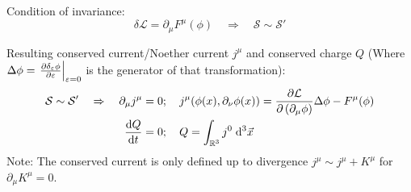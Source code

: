 		\noindent
		Condition of invariance:
		\begin{equation}
			\delta\mathcal{L} = \partial_\mu F^\mu(\phi) 
			\quad \Rightarrow \quad \mathcal{S} \sim \mathcal{S}'
		\end{equation}

		\noindent
		Resulting conserved current/Noether current $j^{\mu}$ and conserved charge $Q$ (Where $\Delta \phi = \eval{\pdv{\delta_\varepsilon \phi}{\varepsilon}}_{\varepsilon=0}$ is the generator of that transformation):
		\begin{equation}
			\begin{aligned}
				\mathcal{S} \sim \mathcal{S}' \quad\Rightarrow\quad 
				\partial_\mu j^\mu &= 0;\quad
				j^\mu \qty( \phi(x), \partial_\nu\phi(x) ) = \pdv{\mathcal{L}}{\left(\partial_\mu \phi\right)}\Delta\phi - F^\mu(\phi) \\
				\dv{Q}{t} &= 0; \quad Q = \int_{\mathbb{R}^3} j^0\;\dd^3\vec{x} \\
			\end{aligned}
		\end{equation}
		Note: The conserved current is only defined up to divergence $j^\mu \sim j^\mu + K^\mu$ for $\partial_\mu K^\mu = 0$.